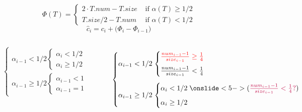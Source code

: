 \begin{frame}{}
  \[
    \Phi(T) = \left.
    \begin{cases}
      2 \cdot T.num - T.size & \text{ if } \alpha(T) \ge 1/2	\\
      T.size/2 - T.num	     & \text{ if } \alpha(T) < 1/2
    \end{cases} \right.
  \]
  \[
    \hat{c}_i = c_i + \Big(\Phi_{i} - \Phi_{i-1}\Big)
  \]

  \pause
  \vspace{0.20cm}
  \centerline{\large \it {}}

  \pause
  \vspace{0.60cm}
  \begin{columns}
      \pause
      \centerline{\large \textsc{}}
      \[
	\left.
	\begin{cases}
	  \alpha_{i-1} < 1/2 \left.
	  \begin{cases}
	    \alpha_{i} < 1/2 \\[6pt]
	    \alpha_{i} \ge 1/2
	  \end{cases} \right.
	  \\[20pt]
	  \alpha_{i-1} \ge 1/2 \left.
	    \begin{cases}
	      \alpha_{i-1} < 1 \\[6pt] 
	      \alpha_{i-1} = 1
	    \end{cases} \right.
	\end{cases} \right.
      \]
      \pause
      \centerline{\large \textsc{}}
      \[
	\left.
	\begin{cases}
	  \alpha_{i-1} < 1/2 \left.
	    \begin{cases}
	      \red{\frac{num_{i-1} - 1}{size_{i-1}} \ge \frac{1}{4}} \\[6pt]
	      \frac{num_{i-1} - 1}{size_{i-1}} < \frac{1}{4}
	    \end{cases} \right.
	  \\[20pt]
	  \alpha_{i-1} \ge 1/2 \left.
	  \begin{cases}
	    \alpha_{i} < 1/2\; \onslide<5->{(\purple{\frac{num_{i-1} - 1}{size_{i-1}} < \frac{1}{4}?})}  \\[6pt]
	    \alpha_{i} \ge 1/2
	  \end{cases} \right.
	\end{cases} \right.
      \]
  \end{columns}
\end{frame}

